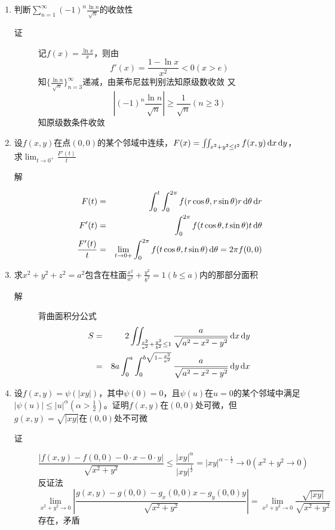 \begin{enumerate}
\item 判断$\sum_{n=1}^{\infty} (-1)^n \frac{\ln n}{\sqrt{n}}$的收敛性
\begin{description}
\item[证] 记$f(x)=\frac{\ln x}{x}$，则由
\[
f'(x)=\frac{1-\ln x}{x^2}<0(x>e)
\]
知$\{\frac{\ln n}{\sqrt{n}}\}_{n=3}^\infty$递减，由莱布尼兹判别法知原级数收敛
又
\[
\left|(-1)^n \frac{\ln n}{\sqrt{n}}\right|\geq\frac{1}{\sqrt{n}} (n\geq 3)
\]
知原级数条件收敛
\end{description}

\item 设$f(x,y)$在点$(0,0)$的某个邻域中连续，$F(x)=\iint_{x^2+y^2\leq t^2}f(x,y)\,\mathrm{d} x \,\mathrm{d} y$，求$\lim_{t\to 0^+}\frac{F'(t)}{t}$
\begin{description}
\item[解]
\begin{eqnarray*}
F(t)&=&\int_0^t\int_0^{2\pi}f(r\cos\theta,r\sin\theta)r\,\mathrm{d} \theta\,\mathrm{d} r\\
F'(t)&=&\int_0^{2\pi}f(t\cos\theta,t\sin\theta)t\,\mathrm{d} \theta\\
\frac{F'(t)}{t}&=& \lim_{t\to 0+} \int_0^{2\pi}f(t\cos\theta,t\sin\theta)\,\mathrm{d} \theta = 2\pi f(0,0)
\end{eqnarray*}
\end{description}

\item 求$x^2+y^2+z^2=a^2$包含在柱面$\frac{x^2}{a^2}+\frac{y^2}{b^2}=1(b\leq a)$内的那部分面积
\begin{description}
\item[解] 背曲面积分公式
\begin{eqnarray*}
S&=& 2\iint_{\frac{x^2}{a^2}+\frac{y^2}{b^2}\leq 1}\frac{a}{\sqrt{a^2-x^2-y^2}}\,\mathrm{d} x\,\mathrm{d} y\\
&=&8a \int_0^a\int_0^{b\sqrt{1-\frac{x^2}{a^2}}}\frac{a}{\sqrt{a^2-x^2-y^2}}\,\mathrm{d} y\,\mathrm{d} x
\end{eqnarray*}
\end{description}


\item 设$f(x,y)=\psi(|xy|)$，其中$\psi(0)=0$，且$\psi(u)$在$u=0$的某个邻域中满足$|\psi(u)|\leq |u|^\alpha (\alpha > \frac{1}{2})$。证明$f(x,y)$在$(0,0)$处可微，但$g(x,y)=\sqrt{|xy|}$在$(0,0)$处不可微
\begin{description}
\item[证]
\[
\frac{|f(x,y)-f(0,0)-0\cdot x-0\cdot y|}{\sqrt{x^2+y^2}}\leq \frac{|xy|^\alpha}{|xy|^\frac{1}{2}}=|xy|^{\alpha-\frac{1}{2}}\to 0(x^2+y^2\to 0)
\]
反证法
\[
\lim_{x^2+y^2\to 0}\left|\frac{g(x,y)-g(0,0)-g_x(0,0)x-g_y(0,0)y}{\sqrt{x^2+y^2}}\right|=\lim_{x^2+y^2\to 0}\frac{\sqrt{|xy|}}{\sqrt{x^2+y^2}}
\]
存在，矛盾
\end{description}


\end{enumerate}
